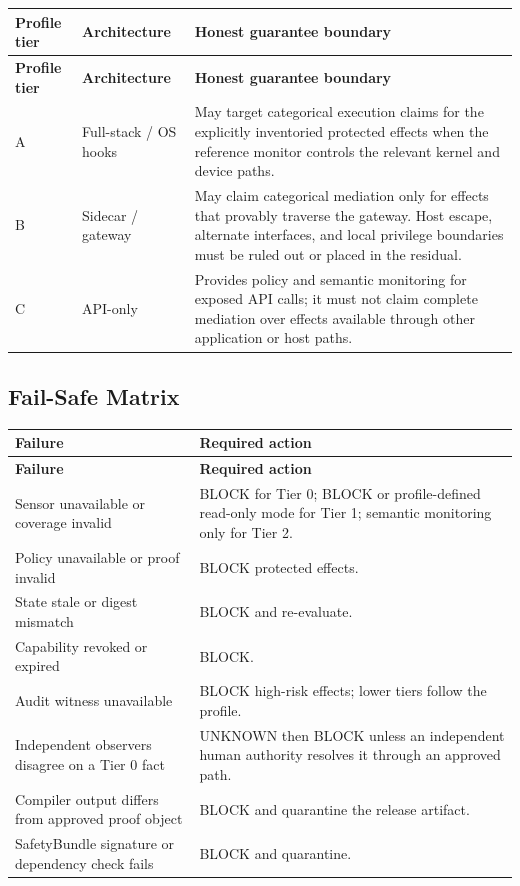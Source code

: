 \documentclass[11pt]{article}
\def\ensuremath#1{#1}%
\def\mathsf#1{#1}%
\newcommand{\SafetyBundle}{\textsf{SafetyBundle}}
\newcommand{\BLOCK}{\ensuremath{\mathsf{BLOCK}}}
\newcommand{\UNKNOWN}{\ensuremath{\mathsf{UNKNOWN}}}
\begin{document}
\begin{longtable}{@{}L{2.2cm} L{4.2cm} L{8.2cm}@{}}
\toprule
\textbf{Profile tier} & \textbf{Architecture} & \textbf{Honest guarantee boundary}\\
\midrule
\endfirsthead
\toprule
\textbf{Profile tier} & \textbf{Architecture} & \textbf{Honest guarantee boundary}\\
\midrule
\endhead
\bottomrule
\endfoot
A & Full-stack / OS hooks & May target categorical execution claims for the explicitly inventoried protected effects when the reference monitor controls the relevant kernel and device paths. \\
B & Sidecar / gateway & May claim categorical mediation only for effects that provably traverse the gateway. Host escape, alternate interfaces, and local privilege boundaries must be ruled out or placed in the residual. \\
C & API-only & Provides policy and semantic monitoring for exposed API calls; it must not claim complete mediation over effects available through other application or host paths. \\
\end{longtable}

\newpage
\subsection{Fail-Safe Matrix}
\begin{longtable}{@{}L{6.0cm} L{7.6cm}@{}}
\toprule
\textbf{Failure} & \textbf{Required action}\\
\midrule
\endfirsthead
\toprule
\textbf{Failure} & \textbf{Required action}\\
\midrule
\endhead
\bottomrule
\endfoot
Sensor unavailable or coverage invalid & \BLOCK{} for Tier 0; \BLOCK{} or profile-defined read-only mode for Tier 1; semantic monitoring only for Tier 2. \\
Policy unavailable or proof invalid & \BLOCK{} protected effects. \\
State stale or digest mismatch & \BLOCK{} and re-evaluate. \\
Capability revoked or expired & \BLOCK{}. \\
Audit witness unavailable & \BLOCK{} high-risk effects; lower tiers follow the profile. \\
Independent observers disagree on a Tier 0 fact & \UNKNOWN{} then \BLOCK{} unless an independent human authority resolves it through an approved path. \\
Compiler output differs from approved proof object & \BLOCK{} and quarantine the release artifact. \\
\SafetyBundle{} signature or dependency check fails & \BLOCK{} and quarantine. \\
\end{longtable}
\end{document}
